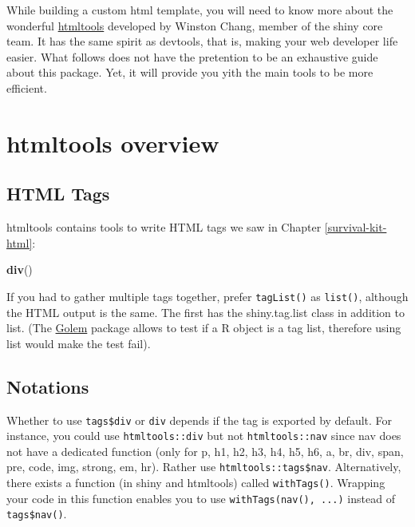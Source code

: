 \documentclass[]{book}
\newenvironment{Shaded}{\begin{snugshade}}{\end{snugshade}}
\newcommand{\KeywordTok}[1]{\textcolor[rgb]{0.13,0.29,0.53}{\textbf{#1}}}
\newcommand{\NormalTok}[1]{#1}
\begin{document}
While building a custom html template, you will need to know more about the wonderful \href{https://github.com/rstudio/htmltools}{htmltools} developed by Winston Chang, member of the shiny core team. It has the same spirit as devtools, that is, making your web developer life easier. What follows does not have the pretention to be an exhaustive guide about this package. Yet, it will provide you yith the main tools to be more efficient.

\hypertarget{htmltools-overview}{%
\chapter{htmltools overview}\label{htmltools-overview}}

\hypertarget{html-tags}{%
\section{HTML Tags}\label{html-tags}}

htmltools contains tools to write HTML tags we saw in Chapter \ref{survival-kit-html}:

\begin{Shaded}
\begin{Highlighting}[]
\KeywordTok{div}\NormalTok{()}
\end{Highlighting}
\end{Shaded}

If you had to gather multiple tags together, prefer \texttt{tagList()} as \texttt{list()}, although the HTML output is the same. The first has the shiny.tag.list class in addition to list. (The \href{http://golemverse.org}{Golem} package allows to test if a R object is a tag list, therefore using list would make the test fail).

\hypertarget{notations}{%
\section{Notations}\label{notations}}

Whether to use \texttt{tags\$div} or \texttt{div} depends if the tag is exported by default.
For instance, you could use \texttt{htmltools::div} but not \texttt{htmltools::nav} since nav does not have a dedicated function (only for p, h1, h2, h3, h4, h5, h6, a, br, div, span, pre, code, img, strong, em, hr).
Rather use \texttt{htmltools::tags\$nav}. Alternatively, there exists a function (in shiny and htmltools)
called \texttt{withTags()}. Wrapping your code in this function enables you to use \texttt{withTags(nav(),\ ...)}
instead of \texttt{tags\$nav()}.
\end{document}
